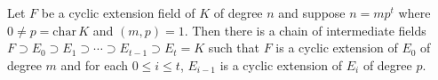 Let $F$ be a cyclic extension field of $K$ of degree $n$ and suppose $n = mp^t$ where $0 \neq p = \mathrm{char}\,K$ and $(m,p) = 1$. Then there is a chain of intermediate fields $F \supset E_0 \supset E_1 \supset \cdots \supset E_{t-1} \supset E_t = K$ such that $F$ is a cyclic extension of $E_0$ of degree $m$ and for each $0 \leq i \leq t$, $E_{i-1}$ is a cyclic extension of $E_i$ of degree $p$.
